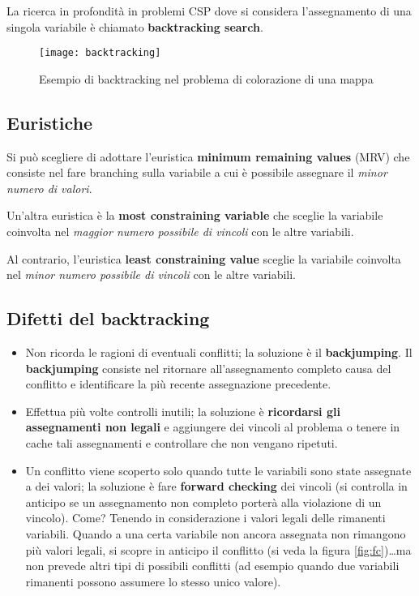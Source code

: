 La ricerca in profondità in problemi CSP dove si considera l'assegnamento
di una singola variabile è chiamato \textbf{backtracking search}.

\begin{figure}[H]
\caption{Esempio di backtracking nel problema di colorazione di una mappa}
\centering
\texttt{[image: backtracking]}
\end{figure}

\subsection{Euristiche}

Si può scegliere di adottare l'euristica \textbf{minimum remaining values}
(MRV) che consiste nel fare branching sulla variabile a cui è possibile
assegnare il \textit{minor numero di valori}.

Un'altra euristica è la \textbf{most constraining variable} che sceglie la
variabile coinvolta nel \textit{maggior numero possibile di vincoli} con le
altre variabili.

Al contrario, l'euristica \textbf{least constraining value} sceglie la
variabile coinvolta nel \textit{minor numero possibile di vincoli} con le
altre variabili.\\

\subsection{Difetti del backtracking}


\begin{itemize}
 \item Non ricorda le ragioni di eventuali conflitti; la soluzione è il
\textbf{backjumping}.
Il \textbf{backjumping} consiste nel ritornare all'assegnamento completo causa del
conflitto e identificare la più recente assegnazione precedente.

 \item Effettua più volte controlli inutili; la soluzione è \textbf{ricordarsi gli
assegnamenti non legali} e aggiungere dei vincoli al problema o tenere in cache
tali assegnamenti e controllare che non vengano ripetuti.

 \item Un conflitto viene scoperto solo quando tutte le variabili sono state assegnate a
dei valori; la soluzione è fare \textbf{forward checking} dei vincoli (si controlla
in anticipo se un assegnamento non completo porterà alla violazione di un vincolo).
Come? Tenendo in considerazione i valori legali delle rimanenti variabili. Quando a
una certa variabile non ancora assegnata non rimangono più valori legali, si scopre
in anticipo il conflitto (si veda la figura \ref{fig:fc})\dots ma non prevede
altri tipi di possibili conflitti (ad esempio quando due variabili rimanenti possono
assumere lo stesso unico valore).
\end{itemize}

